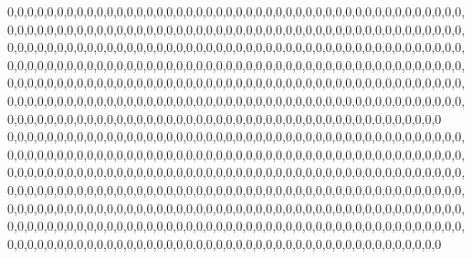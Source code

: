 0,0,0,0,0,0,0,0,0,0,0,0,0,0,0,0,0,0,0,0,0,0,0,0,0,0,0,0,0,0,0,0,0,0,0,0,0,0,0,0,0,0,0,0,0,0,0,0,0,0,0,0,0,0,0,0,0,0,0,0,0,0,0,0,0,0,0,0,0,0,0,0,0,0,0,0,0,0,0,0,0,0,0,0,0,0,0,0,0,0,0,0,0,0,0,0,0,0,0,0,0,0,0,0,0,0,0,0,0,0,0,0,0,0,0,0,0,0,0,0,0,0,0,0,0,0,0,0,0,0,0,0,0,0,0,0,0,0,0,0,0,0,0,0,0,0,0,0,0,0,0,0,0,0,0,0,0,0,0,0,0,0,0,0,0,0,0,0,0,0,0,0,0,0,0,0,0,0,0,0,0,0,0,0,0,0,0,0,0,0,0,0,0,0,0,0,0,0,0,0,0,0,0,0,0,0,0,0,0,0,0,0,0,0,0,0,0,0,0,0,0,0,0,0,0,0,0,0,0,0,0,0,0,0,0,0,0,0,0,0,0,0,0,0,0,0,0,0,0,0,0,0,0,0,0,0,0,0,0,0,0,0,0,0,0,0,0,0,0,0,0,0,0,0,0,0,0,0,0,0,0,0,0,0,0,0,0,0,0,0,0,0,0,0,0,0,0,0,0,0,0,0,0,0,0,0,0,0,0,0,0,0,0,0,0,0,0,0,0,0
0,0,0,0,0,0,0,0,0,0,0,0,0,0,0,0,0,0,0,0,0,0,0,0,0,0,0,0,0,0,0,0,0,0,0,0,0,0,0,0,0,0,0,0,0,0,0,0,0,0,0,0,0,0,0,0,0,0,0,0,0,0,0,0,0,0,0,0,0,0,0,0,0,0,0,0,0,0,0,0,0,0,0,0,0,0,0,0,0,0,0,0,0,0,0,0,0,0,0,0,0,0,0,0,0,0,0,0,0,0,0,0,0,0,0,0,0,0,0,0,0,0,0,0,0,0,0,0,0,0,0,0,0,0,0,0,0,0,0,0,0,0,0,0,0,0,0,0,0,0,0,0,0,0,0,0,0,0,0,0,0,0,0,0,0,0,0,0,0,0,0,0,0,0,0,0,0,0,0,0,0,0,0,0,0,0,0,0,0,0,0,0,0,0,0,0,0,0,0,0,0,0,0,0,0,0,0,0,0,0,0,0,0,0,0,0,0,0,0,0,0,0,0,0,0,0,0,0,0,0,0,0,0,0,0,0,0,0,0,0,0,0,0,0,0,0,0,0,0,0,0,0,0,0,0,0,0,0,0,0,0,0,0,0,0,0,0,0,0,0,0,0,0,0,0,0,0,0,0,0,0,0,0,0,0,0,0,0,0,0,0,0,0,0,0,0,0,0,0,0,0,0,0,0,0,0,0,0,0,0,0,0,0,0,0,0,0,0,0,0
